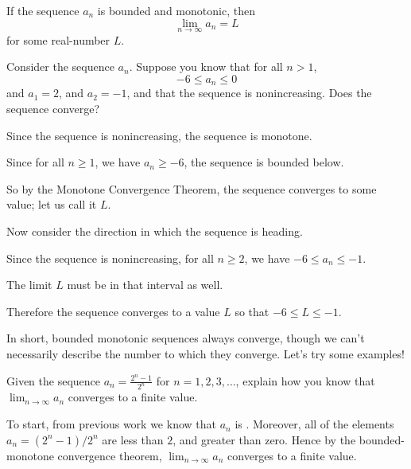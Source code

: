 \documentclass{ximera}
\begin{document}
\begin{theorem}
  If the sequence $a_n$ is bounded and monotonic, then
  \[
  \lim_{n \to  \infty} a_n = L
  \]
  for some real-number $L$.
\end{theorem}
\begin{question}
  Consider the sequence $a_{n}$.  Suppose you know that for all $n >
  1$,
  \[
  -6 \le a_{n} \le 0
  \]
  and $a_{1} = 2$, and $a_{2} = -1$, and that the sequence is
  nonincreasing.  Does the sequence converge?
  \begin{hint}
    Since the sequence is nonincreasing, the sequence is monotone.
  \end{hint}
  \begin{hint}
    Since for all $n \ge 1$, we have $a_{n} \ge -6$, the sequence is
    bounded below.
  \end{hint}
  \begin{hint}
    So by the Monotone Convergence Theorem, the sequence converges to
    some value; let us call it $L$.
  \end{hint}
  \begin{hint}
    Now consider the direction in which the sequence is heading.
  \end{hint}
  \begin{hint}
    Since the sequence is nonincreasing, for all $n \ge 2$, we have
    $-6 \le a_{n} \le -1$.
  \end{hint}
  \begin{hint}
    The limit $L$ must be in that interval as well.
  \end{hint}
  \begin{hint}
    Therefore the sequence converges to a value $L$ so that $-6 \le L
    \le -1$.
  \end{hint}
  \begin{prompt}
  \begin{multipleChoice}
  \end{multipleChoice}
  \end{prompt}
\end{question}

In short, bounded monotonic sequences always converge, though we can't
necessarily describe the number to which they converge.  Let's try
some examples!

\begin{example}
  Given the sequence $a_n=\frac{2^n-1}{2^n}$ for $n=1,2,3,\dots$,
  explain how you know that $\lim_{n\to\infty} a_n$ converges to a
  finite value.
  \begin{explanation}
    To start, from previous work we know that $a_n$ is
    .
    Moreover, all of the elements $a_n = (2^n-1)/2^n$ are less than
    $2$, and greater than zero. Hence by the bounded-monotone
    convergence theorem, $\lim_{n\to\infty} a_n$ converges to a finite
    value.
  \end{explanation}
\end{example}
\end{document}
